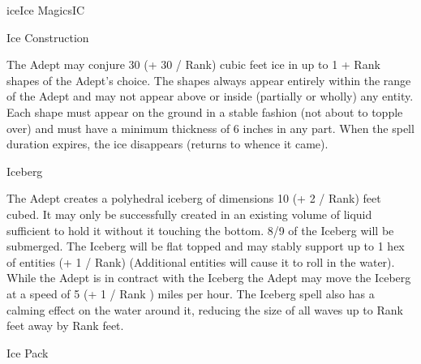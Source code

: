 \begin{college}[1.5]{ice}{Ice Magics}{IC}
\begin{spell}[S-8]{Ice Construction}

\begin{effects}
The Adept may conjure 30 (+ 30 / Rank) cubic feet ice in up to 1 +
Rank shapes of the Adept's choice.  The shapes always appear entirely
within the range of the Adept and may not appear above or inside
(partially or wholly) any entity.  Each shape must appear on the
ground in a stable fashion (not about to topple over) and must have a
minimum thickness of 6 inches in any part.  When the spell duration
expires, the ice disappears (returns to whence it came).
\end{effects}
\end{spell}

\begin{spell}[S-9]{Iceberg}

\begin{effects}
The Adept creates a polyhedral iceberg of dimensions 10 (+ 2 / Rank)
feet cubed.  It may only be successfully created in an existing volume
of liquid sufficient to hold it without it touching the bottom. 8/9 of
the Iceberg will be submerged. The Iceberg will be flat topped and may
stably support up to 1 hex of entities (+ 1 / Rank) (Additional
entities will cause it to roll in the water).  While the Adept is in
contract with the Iceberg the Adept may move the Iceberg at a speed of
5 (+ 1 / Rank ) miles per hour. The Iceberg spell also has a calming
effect on the water around it, reducing the size of all waves up to
Rank feet away by Rank feet.
\end{effects}
\end{spell}

\begin{spell}[S-10]{Ice Pack}


\end{spell}
\end{college}
